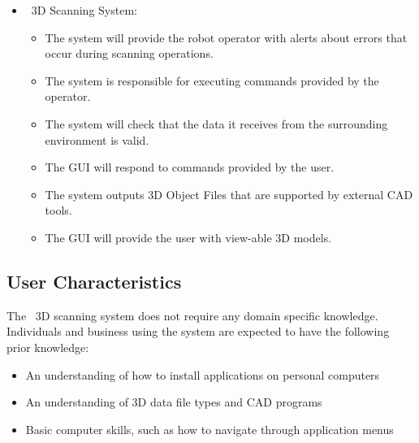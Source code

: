 \documentclass[12pt]{article}
\begin{document}
\begin{itemize}
\item \progname\ 3D Scanning System:
\begin{itemize}
\item The system will provide the robot operator with alerts about errors that occur during scanning operations.
\item The system is responsible for executing commands provided by the operator.
\item The system will check that the data it receives from the surrounding environment is valid.
\item The GUI will respond to commands provided by the user.
\item The system outputs 3D Object Files that are supported by external CAD tools.
\item The GUI will provide the user with view-able 3D models. %
\end{itemize}
\end{itemize}

\subsection{User Characteristics} \label{SecUserCharacteristics}

  
The \progname\ 3D scanning system does not require any domain specific knowledge. Individuals and business using the system are expected to have the following prior knowledge:   
  
\begin{itemize}
\item An understanding of how to install applications on personal computers
\item An understanding of 3D data file types and CAD programs %
\item Basic computer skills, such as how to navigate through application menus
\end{itemize}
\end{document}
